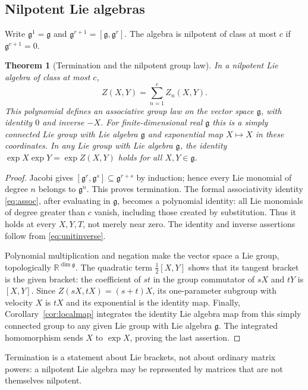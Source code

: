 \documentclass[11pt]{article}
\newtheorem{theorem}{Theorem}[section]
\theoremstyle{definition}
\theoremstyle{remark}
\newcommand{\R}{\mathbb R}
\newcommand{\g}{\mathfrak g}
\numberwithin{equation}{section}
\begin{document}
\subsection{Nilpotent Lie algebras}
Write $\g^1=\g$ and $\g^{r+1}=[\g,\g^r]$. The algebra is nilpotent of class at most $c$ if $\g^{c+1}=0$.
\begin{theorem}[Termination and the nilpotent group law]\label{thm:nilpotent}
In a nilpotent Lie algebra of class at most $c$,
\begin{equation}\label{eq:nilpotent}
 Z(X,Y)=\sum_{n=1}^{c}Z_n(X,Y).
\end{equation}
This polynomial defines an associative group law on the vector space $\g$, with identity $0$ and inverse $-X$. For finite-dimensional real $\g$ this is a simply connected Lie group with Lie algebra $\g$ and exponential map $X\mapsto X$ in these coordinates. In any Lie group with Lie algebra $\g$, the identity $\exp X\exp Y=\exp Z(X,Y)$ holds for all $X,Y\in\g$.
\end{theorem}
\begin{proof}
Jacobi gives $[\g^r,\g^s]\subseteq\g^{r+s}$ by induction; hence every Lie monomial of degree $n$ belongs to $\g^n$. This proves termination. The formal associativity identity \eqref{eq:assoc}, after evaluating in $\g$, becomes a polynomial identity: all Lie monomials of degree greater than $c$ vanish, including those created by substitution. Thus it holds at every $X,Y,T$, not merely near zero. The identity and inverse assertions follow from \eqref{eq:unitinverse}.

Polynomial multiplication and negation make the vector space a Lie group, topologically $\R^{\dim\g}$. The quadratic term $\frac12[X,Y]$ shows that its tangent bracket is the given bracket: the coefficient of $st$ in the group commutator of $sX$ and $tY$ is $[X,Y]$. Since $Z(sX,tX)=(s+t)X$, its one-parameter subgroup with velocity $X$ is $tX$ and its exponential is the identity map. Finally, Corollary~\ref{cor:localmap} integrates the identity Lie algebra map from this simply connected group to any given Lie group with Lie algebra $\g$. The integrated homomorphism sends $X$ to $\exp X$, proving the last assertion.
\end{proof}
Termination is a statement about Lie brackets, not about ordinary matrix powers: a nilpotent Lie algebra may be represented by matrices that are not themselves nilpotent.
\end{document}
